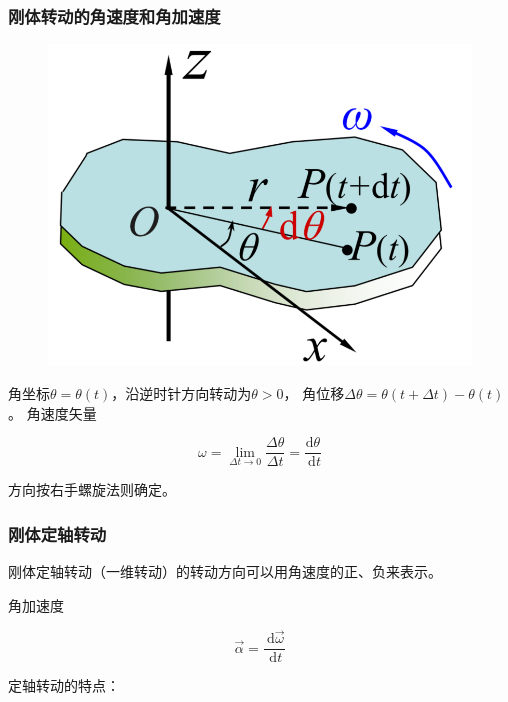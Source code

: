 \documentclass[12pt, a4paper]{article}
\numberwithin{equation}{section}
\newcommand{\rmd}{\mathrm{~d}}
\newcommand{\deriv}[2]{\frac{\rmd #1}{\rmd #2}}
\begin{document}
\subsubsection{刚体转动的角速度和角加速度}

    \begin{figure}
        \centering
        \includegraphics[scale=0.15]{"Chapter 04 images/pic1.png"}
        \label{pic4-1}
    \end{figure}

    角坐标\(\theta = \theta\left(t\right)\)，沿逆时针方向转动为\(\theta > 0\)，
    角位移\(\Delta \theta = \theta \left(t + \Delta t\right) - \theta\left(t\right)\)。
    角速度矢量

    \begin{equation}
        \omega=\lim _{\Delta t \rightarrow 0} \frac{\Delta \theta}{\Delta t}=\frac{\mathrm{d} \theta}{\mathrm{~d} t}
    \end{equation}

    方向按右手螺旋法则确定。

\subsubsection{刚体定轴转动}

    刚体定轴转动（一维转动）的转动方向可以用角速度的正、负来表示。

    角加速度

    $$
        \overrightarrow{\alpha} = \deriv{\overrightarrow{\omega}}{t}
    $$

    定轴转动的特点：
\end{document}
